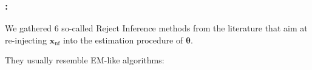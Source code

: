 \documentclass[english,xcolor={rgb,dvipsnames,table,usenames}, presentation]{beamer}
\newcommand{\nf}{\text{nf}}
\begin{document}
\begin{frame}
\frametitle{\secname : \subsecname}







We gathered 6 so-called Reject Inference methods from the literature
that aim at re-injecting $\bm{\mathbf{x}}_{\nf}$ into the estimation procedure of $\bm{\theta}$.

\medskip

They usually resemble EM-like algorithms:

{

}
\end{frame}
\end{document}
